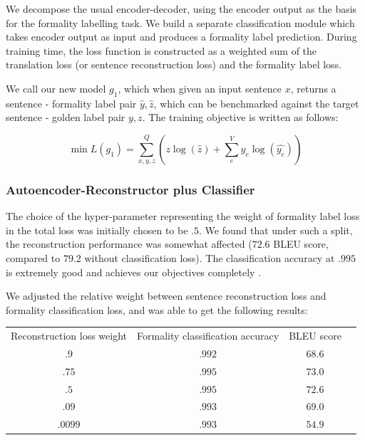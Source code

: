 \documentclass[11pt]{article}
\begin{document}
We decompose the usual encoder-decoder, using the encoder output as the basis for the formality labelling task. We build a separate classification module which takes encoder output as input and produces a formality label prediction. During training time, the loss function is constructed as a weighted sum of the translation loss (or sentence reconstruction loss) and the formality label loss.

We call our new model $g_1$, which when given an input sentence $x$, returns a sentence - formality label pair $\hat{y}, \hat{z}$, which can be benchmarked against the target sentence - golden label pair $y, z$. The training objective is written as follows:

\begin{equation}
    \min{L(g_1)} = \sum_{x, y, z}^Q{(z \log{(\hat{z})} + \sum_{e}^{V}{y_e \log{(\hat{y_e})}})}
\end{equation}

\subsubsection{Autoencoder-Reconstructor plus Classifier}

The choice of the hyper-parameter representing the weight of formality label loss in the total loss was initially chosen to be $.5$. We found that under such a split, the reconstruction performance was somewhat affected ($72.6$ BLEU score, compared to $79.2$ without classification loss). The classification accuracy at $.995$ is extremely good and achieves our objectives completely .

We adjusted the relative weight between sentence reconstruction loss and formality classification loss, and was able to get the following results:

\begin{tabular}{ c c c c }
    Reconstruction loss weight & Formality classification accuracy & BLEU score \\
    $.9$ & $.992$ & $68.6$ \\
    $.75$ & $.995$ & $73.0$ \\
    $.5$ & $.995$ & $72.6$ \\
    $.09$ & $.993$ & $69.0$ \\
    $.0099$ & $.993$ & $54.9$ \\
\end{tabular}
\end{document}
